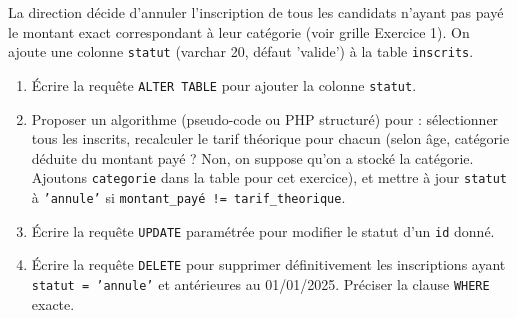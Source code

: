 \documentclass[11pt]{article}
\begin{document}
\begin{exercice}
La direction décide d'annuler l'inscription de tous les candidats n'ayant pas payé le montant exact correspondant à leur catégorie (voir grille Exercice 1). On ajoute une colonne \texttt{statut} (varchar 20, défaut 'valide') à la table \texttt{inscrits}.
\begin{enumerate}
    \item Écrire la requête \texttt{ALTER TABLE} pour ajouter la colonne \texttt{statut}.
    \item Proposer un algorithme (pseudo-code ou PHP structuré) pour : sélectionner tous les inscrits, recalculer le tarif théorique pour chacun (selon âge, catégorie déduite du montant payé ? Non, on suppose qu'on a stocké la catégorie. Ajoutons \texttt{categorie} dans la table pour cet exercice), et mettre à jour \texttt{statut} à \texttt{'annule'} si \texttt{montant\_payé != tarif\_theorique}.
    \item Écrire la requête \texttt{UPDATE} paramétrée pour modifier le statut d'un \texttt{id} donné.
    \item Écrire la requête \texttt{DELETE} pour supprimer définitivement les inscriptions ayant \texttt{statut = 'annule'} et antérieures au 01/01/2025. Préciser la clause \texttt{WHERE} exacte.
\end{enumerate}
\end{exercice}
\end{document}
